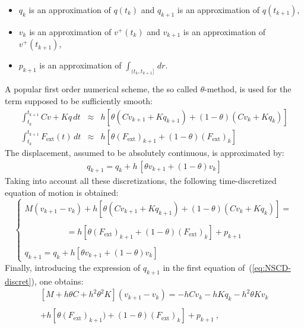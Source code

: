 \begin{itemize}
\item $q_{k}$ is an approximation of $q(t_{k})$ and $q_{k+1}$ is an approximation of $q(t_{k+1})$,

\item $v_{k}$ is an approximation of $v^+(t_{k})$ and $v_{k+1}$ is an approximation of $v^+(t_{k+1})$,

\item $p_{k+1}$ is an approximation of $ \displaystyle \int_{(t_k,t_{k+1}]} \,dr$.
\end{itemize}
%
A popular first order numerical scheme, the so called $\theta$-method, is used for the term supposed to be sufficiently smooth:
\begin{eqnarray}
  \displaystyle \int_{t_k}^{t_{k+1}} C v + K q \,dt  &\approx&
  h \left[ \theta (C v_{k+1}+K q_{k+1}) + (1-\theta) (C v_{k}+K q_{k}) \right]   \nonumber \\
  \displaystyle \int_{t_k}^{t_{k+1}} F_{\mathrm{ext}}(t) \,dt &\approx&
  h\left[\theta  (F_{\mathrm{ext}})_{k+1}+(1-\theta)  (F_{\mathrm{ext}})_{k}  \right]  \nonumber
\end{eqnarray}
The displacement, assumed to be absolutely continuous, is approximated by:
\begin{eqnarray}
&  q_{k+1} = q_{k} +  h\,\left[\theta v_{k+1}+(1-\theta) v_{k}  \right] & \nonumber
\end{eqnarray}
Taking into account all these discretizations, the following time-discretized equation of motion is obtained:
\begin{equation}
\label{eq:NSCD-discret}
\begin{cases}
    M (v_{k+1}-v_{k}) + h\left[\theta  (C  v_{k+1}+K q_{k+1}) + (1-\theta) (C v_{k}+K q_{k})  \right] = \\ \\
    \quad\quad\quad\quad\quad = h\left[\theta  (F_{\mathrm{ext}})_{k+1}+(1-\theta)  (F_{\mathrm{ext}})_{k}  \right] + p_{k+1} \\  \\
    q_{k+1} = q_{k} +  h\left[\theta v_{k+1}+(1-\theta) v_{k} \right]
\end{cases}
\end{equation}
Finally, introducing the expression of $q_{k+1}$ in the first equation of~(\ref{eq:NSCD-discret}), one obtains:
\begin{eqnarray}
  \label{eq:23}
&  \left[M+h\theta C + h^2 \theta^2 K\right] (v_{k+1} -v_{k}) = - h  C v_{k} - h K q_{k} - h^2 \theta  K v_{k} & \nonumber \\ \nonumber \\
&+  h\left[\theta  (F_{\mathrm{ext}})_{k+1})+(1-\theta)  (F_{\mathrm{ext}})_{k}  \right]  + p_{k+1}  \:, &
\end{eqnarray}

